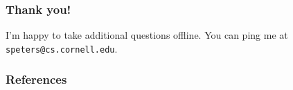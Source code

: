 \documentclass[usenames, dvipsnames, t, table]{beamer}
\newcommand{\eps}{\epsilon}
\begin{document}

  \begin{frame}
    \frametitle{Thank you!}
    I'm happy to take additional questions offline. \newline You can ping me at \texttt{speters@cs.cornell.edu}.
  \end{frame}

  \begin{frame}[allowframebreaks]
    \frametitle{References}
    
    
  \end{frame}

\end{document}
